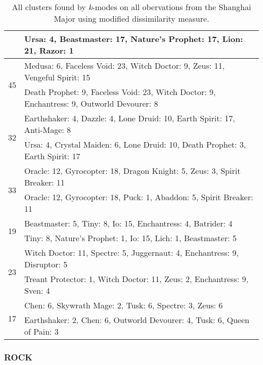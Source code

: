 \documentclass[result.tex]{subfiles}
\begin{document}
\begin{table}[H]
\begin{tabular}{ | c | p{12.5cm} | }
    & Ursa: 4, Beastmaster: 17, Nature's Prophet: 17, Lion: 21, Razor: 1 \\
    \hline
    \multirow{2}{*}{45}
    & Medusa: 6, Faceless Void: 23, Witch Doctor: 9, Zeus: 11, Vengeful Spirit: 15 \\
    & Death Prophet: 9, Faceless Void: 23, Witch Doctor: 9, Enchantress: 9, Outworld Devourer: 8 \\
    \hline
    \multirow{2}{*}{32}
    & Earthshaker: 4, Dazzle: 4, Lone Druid: 10, Earth Spirit: 17, Anti-Mage: 8 \\
    & Ursa: 4, Crystal Maiden: 6, Lone Druid: 10, Death Prophet: 3, Earth Spirit: 17 \\
    \hline
    \multirow{2}{*}{33}
    & Oracle: 12, Gyrocopter: 18, Dragon Knight: 5, Zeus: 3, Spirit Breaker: 11 \\
    & Oracle: 12, Gyrocopter: 18, Puck: 1, Abaddon: 5, Spirit Breaker: 11 \\
    \hline
    \multirow{2}{*}{19}
    & Beastmaster: 5, Tiny: 8, Io: 15, Enchantress: 4, Batrider: 4 \\
    & Tiny: 8, Nature's Prophet: 1, Io: 15, Lich: 1, Beastmaster: 5 \\
    \hline
    \multirow{2}{*}{23}
    & Witch Doctor: 11, Spectre: 5, Juggernaut: 4, Enchantress: 9, Disruptor: 5 \\
    & Treant Protector: 1, Witch Doctor: 11, Zeus: 2, Enchantress: 9, Sven: 4 \\
    \hline
    \multirow{2}{*}{17}
    & Chen: 6, Skywrath Mage: 2, Tusk: 6, Spectre: 3, Zeus: 6 \\
    & Earthshaker: 2, Chen: 6, Outworld Devourer: 4, Tusk: 6, Queen of Pain: 3 \\
    \hline
  \end{tabular}
  \caption{All clusters found by \textit{k}-modes on all obervations from the Shanghai Major using modified dissimilarity measure.}
  \label{tab:cl_app_shanghai_kmodes_mod}
\end{table}

\newpage

\subsubsection*{ROCK}
\end{document}

